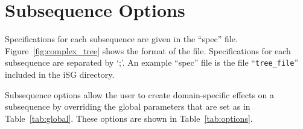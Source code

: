 \documentclass[10pt]{article}
\begin{document}
\section{Subsequence Options}
\label{sec:options}

Specifications for each subsequence are given in the ``spec'' file.
Figure~\ref{fig:complex_tree} shows the format of the file. Specifications for each
subsequence are separated by `;'. An example ``spec'' file is the file ``{\tt tree\_file}'' included in the iSG directory.

Subsequence options allow the user to create domain-specific effects on a subsequence by
overriding the global parameters that are set as in Table~\ref{tab:global}.  These options are shown in Table~\ref{tab:options}.

\begin{small}


\end{small}
\end{document}
